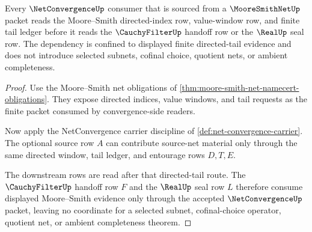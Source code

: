 \begin{theorem}
\label{thm:net-convergence-moore-smith-dependency}
Every $\NetConvergenceUp$ consumer that is sourced from a $\MooreSmithNetUp$ packet reads the Moore--Smith directed-index row, value-window row, and finite tail ledger before it reads the $\CauchyFilterUp$ handoff row or the $\RealUp$ seal row. The dependency is confined to displayed finite directed-tail evidence and does not introduce selected subnets, cofinal choice, quotient nets, or ambient completeness.
\end{theorem}
\begin{proof}
Use the Moore--Smith net obligations of \autoref{thm:moore-smith-net-namecert-obligations}. They expose directed indices, value windows, and tail requests as the finite packet consumed by convergence-side readers.

Now apply the NetConvergence carrier discipline of \autoref{def:net-convergence-carrier}. The optional source row $A$ can contribute source-net material only through the same directed window, tail ledger, and entourage rows $D,T,E$.

The downstream rows are read after that directed-tail route. The $\CauchyFilterUp$ handoff row $F$ and the $\RealUp$ seal row $L$ therefore consume displayed Moore--Smith evidence only through the accepted $\NetConvergenceUp$ packet, leaving no coordinate for a selected subnet, cofinal-choice operator, quotient net, or ambient completeness theorem.
\end{proof}

